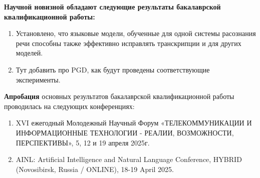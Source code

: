 \textbf{Научной новизной обладают следующие результаты бакалаврской
  квалификационной работы:}
\begin{enumerate}
\item Установлено, что языковые модели, обученные для одной системы расознания речи способны также эффективно исправлять транскрипции и для других моделей.
\item Тут добавить про PGD, как будут проведены соответствующие эксперименты.
\end{enumerate}


\textbf{Апробация} основных результатов бакалаврской квалификационной работы проводилась на следующих конференциях:
\begin{enumerate}
  \item XVI ежегодный Молодежный Научный Форум «ТЕЛЕКОММУНИКАЦИИ И ИНФОРМАЦИОННЫЕ ТЕХНОЛОГИИ - РЕАЛИИ, ВОЗМОЖНОСТИ, ПЕРСПЕКТИВЫ», 5, 12 и 19 апреля 2025г.
  \item AINL: Artificial Intelligence and Natural Language Conference, HYBRID (Novosibirsk, Russia / ONLINE), 18-19 April 2025.
\end{enumerate}
